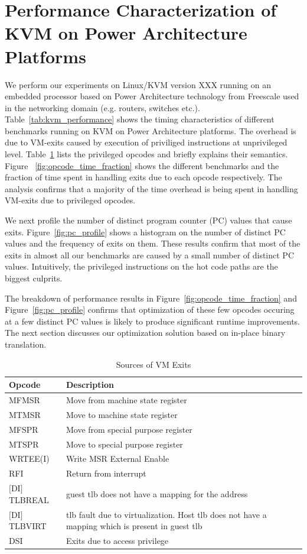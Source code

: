 \documentclass[10pt,twocolumn]{article}
\begin{document}
\section{Performance Characterization of KVM on Power Architecture Platforms}
\label{sec:performance_char}
We perform our experiments on Linux/KVM version XXX running on an
embedded processor based on Power Architecture technology from Freescale used in the networking
domain (e.g. routers, switches etc.).
Table~\ref{tab:kvm_performance} shows the timing characteristics of
different benchmarks running on KVM on Power Architecture platforms. The
overhead is due to VM-exits caused by execution of priviliged instructions
at unprivileged level. Table~\ref{tab:priv_opcodes} lists the privileged
opcodes and briefly explains their semantics.
Figure ~\ref{fig:opcode_time_fraction} shows
the different benchmarks and the fraction of time spent in handling
exits due to each opcode respectively. The analysis confirms that a
majority of the time overhead is being spent in handling VM-exits due
to privileged opcodes.

We next profile the number of distinct program counter (PC) values that
cause exits. Figure~\ref{fig:pc_profile} shows a histogram on the number
of distinct PC values and the frequency of exits on them. These results
confirm that most of the exits in almost all our benchmarks are caused
by a small number of distinct PC values. Intuitively, the privileged
instructions on the hot code paths are the biggest culprits.

The breakdown of performance results in Figure~\ref{fig:opcode_time_fraction}
and Figure~\ref{fig:pc_profile} confirms that optimization of these
few opcodes occuring at a few distinct PC values is likely to produce
significant runtime improvements. The next section discusses our
optimization solution based on in-place binary translation.

\begin{table}[!b]
\centering
\caption{Sources of VM Exits}
     \begin{tabular}{|l | p{5cm} |} \hline
       Opcode \verb, , & Description \\ \hline
       MFMSR & Move from machine state register \\ \hline
       MTMSR & Move to machine state register \\\hline
	   MFSPR & Move from special purpose register \\\hline
	   MTSPR & Move to special purpose register \\\hline
	   WRTEE(I) & Write MSR External Enable  \\\hline
	   RFI & Return from interrupt \\\hline
	   $[$DI$]$TLBREAL & guest tlb does not have a mapping for the address\\\hline
	   $[$DI$]$TLBVIRT & tlb fault due to virtualization. Host tlb does not have a mapping which is present in guest tlb \\    \hline
   	   DSI & Exits due to access privilege \\\hline

     \end{tabular}
\label{tab:priv_opcodes}
\end{table}
\end{document}
